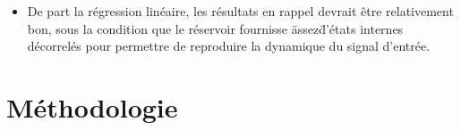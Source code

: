 \documentclass[12pt]{article}
\begin{document}
\begin{itemize}
\item De part la régression linéaire, les résultats en rappel devrait être relativement bon, sous la condition que le réservoir fournisse \"assez\" d'états internes décorrelés pour permettre de reproduire la dynamique du signal d'entrée.
\end{itemize}


\section{Méthodologie}

\subsection{} 



\end{document}
